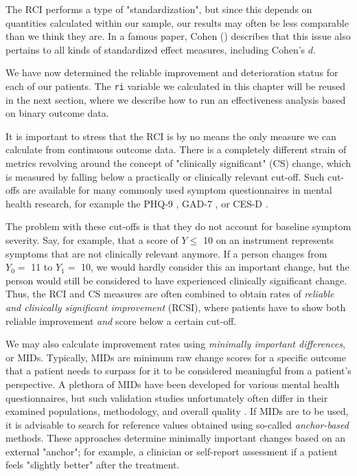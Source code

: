 \begin{box-info-continued}
\vspace{2mm}

\hspace*{5mm} The RCI performs a type of "standardization", but since this depends on quantities calculated within our sample, our results may often be less comparable than we think they are. In a famous paper, Cohen (\citeyear{cohen1994earth}) describes that this issue also pertains to all kinds of standardized effect measures, including Cohen's $d$. 

\end{box-info-continued}

We have now determined the reliable improvement and deterioration status for each of our patients. The \texttt{ri} variable we calculated in this chapter will be reused in the next section, where we describe how to run an effectiveness analysis based on binary outcome data. 

It is important to stress that the RCI is by no means the only measure we can calculate from continuous outcome data. There is a completely different strain of metrics revolving around the concept of "clinically significant" (CS) change, which is measured by falling below a practically or clinically relevant cut-off. Such cut-offs are available for many commonly used symptom questionnaires in mental health research, for example the PHQ-9 \citep{manea2012optimal}, GAD-7 \citep{spitzer2006brief}, or CES-D \citep{vilagut2016screening}. 

The problem with these cut-offs is that they do not account for baseline symptom severity. Say, for example, that a score of $Y\leq$ 10 on an instrument represents symptoms that are not clinically relevant anymore. If a person changes from $Y_0=$ 11 to $Y_1=$ 10, we would hardly consider this an important change, but the person would still be considered to have experienced clinically significant change. Thus, the RCI and CS measures are often combined to obtain rates of \emph{reliable and clinically significant improvement} (RCSI), where patients have to show both reliable improvement \emph{and} score below a certain cut-off.

We may also calculate improvement rates using \emph{minimally important differences}, or MIDs. Typically, MIDs are minimum raw change scores for a specific outcome that a patient needs to surpass for it to be considered meaningful from a patient's perspective. A plethora of MIDs have been developed for various mental health questionnaires, but such validation studies unfortunately often differ in their examined populations, methodology, and overall quality \citep{devji2021mind}. If MIDs are to be used, it is advisable to search for reference values obtained using so-called \emph{anchor-based} methods. These approaches determine minimally important changes based on an external "anchor"; for example, a clinician or self-report assessment if a patient feels "slightly better" after the treatment. 

